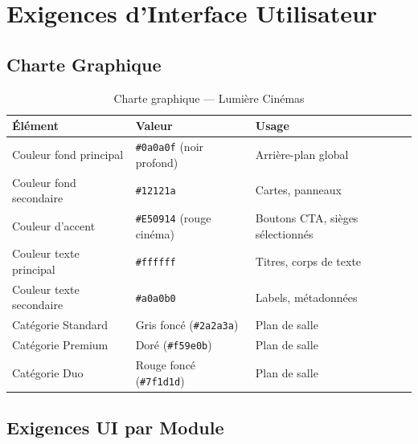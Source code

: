 \documentclass[12pt,a4paper,openany]{report}
\begin{document}
\chapter{Exigences d'Interface Utilisateur}

\section{Charte Graphique}

\begin{table}[H]
\centering
\begin{tabular}{lll}
\toprule
\textbf{Élément} & \textbf{Valeur} & \textbf{Usage} \\
\midrule
Couleur fond principal  & \texttt{\#0a0a0f} (noir profond)  & Arrière-plan global \\
Couleur fond secondaire & \texttt{\#12121a}                  & Cartes, panneaux \\
Couleur d'accent        & \texttt{\#E50914} (rouge cinéma)   & Boutons CTA, sièges sélectionnés \\
Couleur texte principal & \texttt{\#ffffff}                  & Titres, corps de texte \\
Couleur texte secondaire& \texttt{\#a0a0b0}                  & Labels, métadonnées \\
Catégorie Standard      & Gris foncé (\texttt{\#2a2a3a})     & Plan de salle \\
Catégorie Premium       & Doré (\texttt{\#f59e0b})           & Plan de salle \\
Catégorie Duo           & Rouge foncé (\texttt{\#7f1d1d})    & Plan de salle \\
\bottomrule
\end{tabular}
\caption{Charte graphique — Lumière Cinémas}
\end{table}

\section{Exigences UI par Module}
\end{document}
